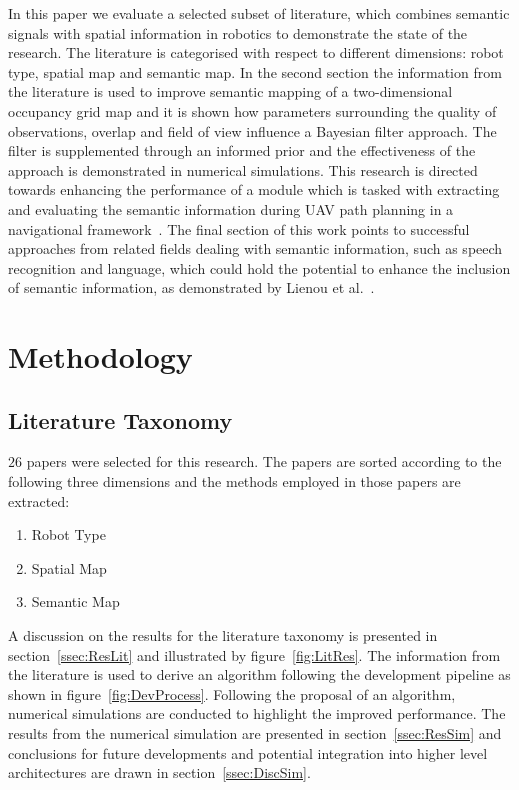 \documentclass[twocolumn,letterpaper]{IEEEAerospaceCLS}  %
\begin{document}
In this paper we evaluate a selected subset of literature, which combines semantic signals with spatial information in robotics to demonstrate the state of the research. The literature is categorised with respect to different dimensions: robot type, spatial map and semantic map. In the second section the information from the literature is used to improve semantic mapping of a two-dimensional occupancy grid map and it is shown how parameters surrounding the quality of observations, overlap and field of view influence a Bayesian filter approach. The filter is supplemented through an informed prior and the effectiveness of the approach is demonstrated in numerical simulations. This research is directed towards enhancing the performance of a module which is tasked with extracting and evaluating the semantic information during UAV path planning in a navigational framework~\cite{mandel_towards_2020}. The final section of this work points to successful approaches from related fields dealing with semantic information, such as speech recognition and language, which could hold the potential to enhance the inclusion of semantic information, as demonstrated by Lienou et al.~\cite{lienou_semantic_2010}.
\section{Methodology} \label{sec:Met}
\subsection{Literature Taxonomy} \label{ssec:MetLit}
$26$ papers were selected for this research. The papers are sorted according to the following three dimensions and the methods employed in those papers are extracted:
\begin{enumerate}
    \item Robot Type
    \item Spatial Map
    \item Semantic Map
\end{enumerate}
A discussion on the results for the literature taxonomy is presented in section~\ref{ssec:ResLit} and illustrated by figure~\ref{fig:LitRes}. The information from the literature is used to derive an algorithm following the development pipeline as shown in figure~\ref{fig:DevProcess}. Following the proposal of an algorithm, numerical simulations are conducted to highlight the improved performance. The results from the numerical simulation are presented in section~\ref{ssec:ResSim} and conclusions for future developments and potential integration into higher level architectures are drawn in section~\ref{ssec:DiscSim}.
\end{document}
